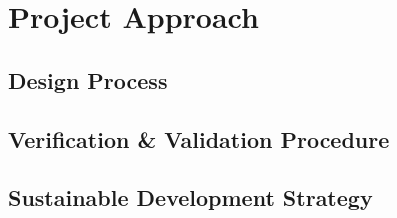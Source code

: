 \chapter{Project Approach}
\setlength{\parindent}{15pt}
\label{ch:proj_appr}

\section{Design Process}
\label{sec:desi_proc}

\section{Verification \& Validation Procedure}
\label{sec:veri_vali_proc}

\section{Sustainable Development Strategy}
\label{sec:sust_deve_stra}
